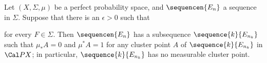 
 Let $(X,\Sigma,\mu)$ be a perfect probability
space, and $\sequencen{E_n}$ a sequence in $\Sigma$.   Suppose that
there is an $\epsilon>0$ such that


\noindent for
every $F\in\Sigma$.   Then $\sequencen{E_n}$ has a subsequence
$\sequence{k}{E_{n_k}}$ such that $\mu_*A=0$ and $\mu^*A=1$ for any
cluster point $A$ of $\sequence{k}{E_{n_k}}$ in $\Cal PX$;  in
particular, $\sequence{k}{E_{n_k}}$ has no measurable cluster point.

